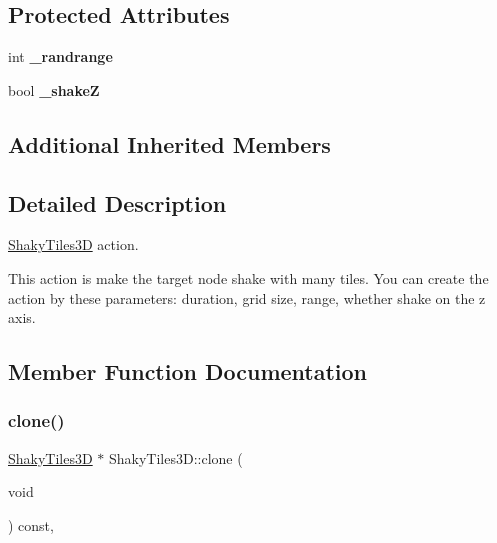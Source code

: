 \subsection*{Protected Attributes}
\begin{DoxyCompactItemize}
\item 
\mbox{\label{classShakyTiles3D_a843fb650aa007c414dae8b67fb3a3ae0}} 
int {\bfseries \+\_\+randrange}
\item 
\mbox{\label{classShakyTiles3D_a8bb3b9543f3eebc6f92ec190cfa9be4a}} 
bool {\bfseries \+\_\+shakeZ}
\end{DoxyCompactItemize}
\subsection*{Additional Inherited Members}


\subsection{Detailed Description}
\hyperlink{classShakyTiles3D}{Shaky\+Tiles3D} action. 

This action is make the target node shake with many tiles. You can create the action by these parameters\+: duration, grid size, range, whether shake on the z axis. 

\subsection{Member Function Documentation}
\mbox{\label{classShakyTiles3D_ad83d154be5494000eb8fcfe657e503ff}} 
\subsubsection{\texorpdfstring{clone()}{clone()}\hspace{0.1cm}{\footnotesize\ttfamily [1/2]}}
{\footnotesize\ttfamily \hyperlink{classShakyTiles3D}{Shaky\+Tiles3D} $\ast$ Shaky\+Tiles3\+D\+::clone (\begin{DoxyParamCaption}\item[{void}]{ }\end{DoxyParamCaption}) const\hspace{0.3cm}{\ttfamily [override]}, {\ttfamily [virtual]}}

